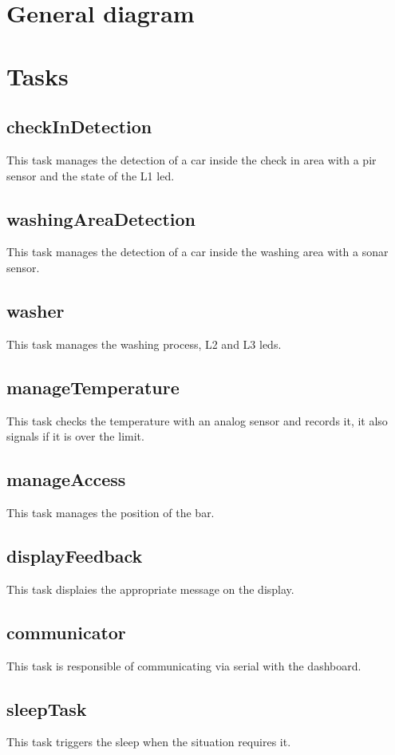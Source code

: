 \section{General diagram}
\pagebreak
\section{Tasks}
\subsection{checkInDetection}
This task manages the detection of a car inside the check in area with a pir sensor and the state of the L1 led.
\subsection{washingAreaDetection}
This task manages the detection of a car inside the washing area with a sonar sensor.
\subsection{washer}
This task manages the washing process, L2 and L3 leds.
\subsection{manageTemperature}
This task checks the temperature with an analog sensor and records it, it also signals if it is over the limit.
\subsection{manageAccess}
This task manages the position of the bar.
\subsection{displayFeedback}
This task displaies the appropriate message on the display.
\subsection{communicator}
This task is responsible of communicating via serial with the dashboard.
\subsection{sleepTask}
This task triggers the sleep when the situation requires it.

